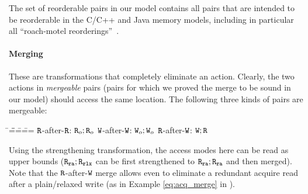 The set of reorderable pairs in our model contains all pairs that are intended to be reorderable in the C/C++ 
and Java memory models,
including in particular all ``roach-motel reorderings''~\cite{c11comp,sevcik:jmm}.


\paragraph{Merging}
These are transformations that completely eliminate an action.
Clearly, the two actions in \emph{mergeable} pairs (pairs for which we proved the merge to be sound in our model)
should access the same location. The following three kinds of pairs are mergeable:
\begin{tabbing}
\hspace{1.4cm}\=\hspace{1.5cm}=\=\hspace{1.4cm}\=\hspace{1.5cm}=\=\hspace{1.4cm}=\=\hspace{1.5cm}=\kill
 $\texttt{R}$-after-$\texttt{R}$: \>  $\texttt{R}_o;\texttt{R}_o$ \>  $\texttt{W}$-after-$\texttt{W}$: \>   $\texttt{W}_o;\texttt{W}_o$ \>  $\texttt{R}$-after-$\texttt{W}$: \> $\texttt{W};\texttt{R}$
\end{tabbing} 

Using the strengthening transformation, the access modes here can be read as upper bounds
(\eg $\texttt{R}_{\texttt{ra}};\texttt{R}_{\texttt{rlx}}$ can be first strengthened to $\texttt{R}_{\texttt{ra}};\texttt{R}_{\texttt{ra}}$ and then merged).
Note that the  $\texttt{R}$-after-$\texttt{W}$ merge allows 
even to eliminate a redundant acquire read after a plain/relaxed write (as in Example \ref{eq:acq_merge} in ).

